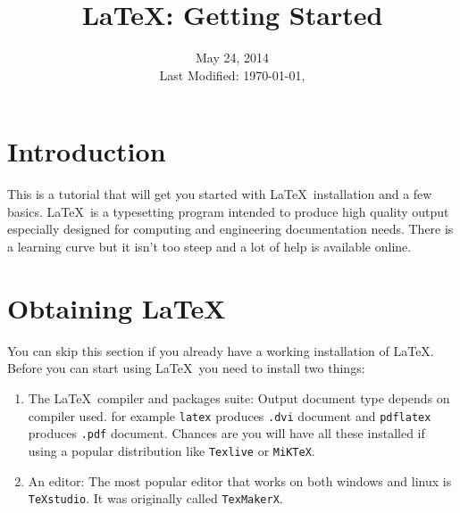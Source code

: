 \documentclass[12pt,a4paper]{article}
\title{\LaTeX: Getting Started}
\author{}
\date{May 24, 2014\\[0.2cm] Last Modified: \today, \currenttime}
\begin{document}
\maketitle
\section{Introduction}
This is a tutorial that will get you started with \LaTeX~installation and a few basics. \LaTeX~is a typesetting program intended to produce high quality output especially designed for computing and engineering documentation needs. There is a learning curve but it isn't too steep and a lot of help is available online.
\section{Obtaining \LaTeX}
You can skip this section if you already have a working installation of \LaTeX. Before you can start using \LaTeX~you need to install two things:
\begin{enumerate}
\item The \LaTeX~compiler and packages suite: Output document type depends on compiler used. for example \verb|latex| produces \verb|.dvi| document and \verb|pdflatex| produces \verb|.pdf| document. Chances are you will have all these installed if using a popular distribution like \verb|Texlive| or \verb|MiKTeX|.
\item An editor: The most popular editor that works on both windows and linux is \verb|TeXstudio|. It was originally called \verb|TexMakerX|.
\end{enumerate}
\end{document}
